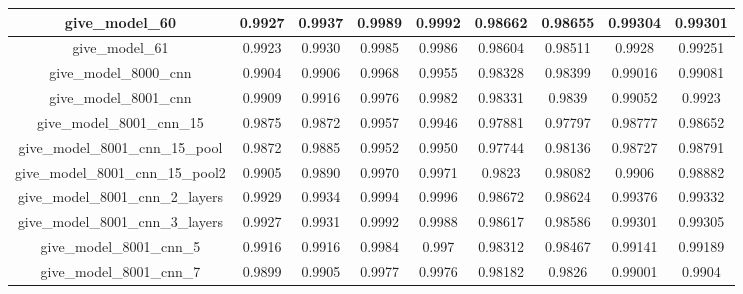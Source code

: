 \begin{table}[!h]
\begin{tabular} {|c|c|c|c|c|c|c|c|c| }
        give\_model\_60                   & 0.9927                        & 0.9937                         & 0.9989                      & 0.9992                  & 0.98662 & 0.98655 & 0.99304 & 0.99301 \\ \hline
        give\_model\_61                   & 0.9923                        & 0.9930                         & 0.9985                      & 0.9986                  & 0.98604 & 0.98511 & 0.9928  & 0.99251 \\ \hline
        give\_model\_8000\_cnn            & 0.9904                        & 0.9906                         & 0.9968                      & 0.9955                  & 0.98328 & 0.98399 & 0.99016 & 0.99081 \\ \hline
        give\_model\_8001\_cnn            & 0.9909                        & 0.9916                         & 0.9976                      & 0.9982                  & 0.98331 & 0.9839  & 0.99052 & 0.9923  \\ \hline
        give\_model\_8001\_cnn\_15        & 0.9875                        & 0.9872                         & 0.9957                      & 0.9946                  & 0.97881 & 0.97797 & 0.98777 & 0.98652 \\ \hline
        give\_model\_8001\_cnn\_15\_pool  & 0.9872                        & 0.9885                         & 0.9952                      & 0.9950                  & 0.97744 & 0.98136 & 0.98727 & 0.98791 \\ \hline
        give\_model\_8001\_cnn\_15\_pool2 & 0.9905                        & 0.9890                         & 0.9970                      & 0.9971                  & 0.9823  & 0.98082 & 0.9906  & 0.98882 \\ \hline
        give\_model\_8001\_cnn\_2\_layers & 0.9929                        & 0.9934                         & 0.9994                      & 0.9996                  & 0.98672 & 0.98624 & 0.99376 & 0.99332 \\ \hline
        give\_model\_8001\_cnn\_3\_layers & 0.9927                        & 0.9931                         & 0.9992                      & 0.9988                  & 0.98617 & 0.98586 & 0.99301 & 0.99305 \\ \hline
        give\_model\_8001\_cnn\_5         & 0.9916                        & 0.9916                         & 0.9984                      & 0.997                   & 0.98312 & 0.98467 & 0.99141 & 0.99189 \\ \hline
        give\_model\_8001\_cnn\_7         & 0.9899                        & 0.9905                         & 0.9977                      & 0.9976                  & 0.98182 & 0.9826  & 0.99001 & 0.9904  \\ \hline

\end{tabular}
\end{table}

